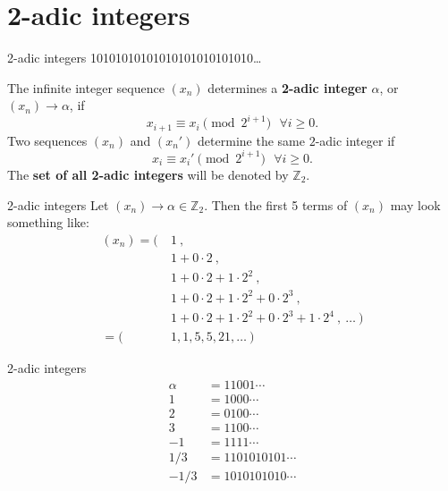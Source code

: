\documentclass{beamer}
\def\zzz{\mathbb{Z}}
\def\xn{(x_n)}
\begin{document}
\section{2-adic integers}
\begin{frame}{2-adic integers}
  10101010101010101010101010\ldots\\
  \pause
  \begin{definition}
    The infinite integer sequence $\xn$
    determines a {\bf 2-adic integer} $\alpha$, or
    $\xn \rightarrow \alpha$, if
    \begin{equation} \label{eq:seq}
    x_{i+1} \equiv x_i\pmod{2^{i+1}} \ \ \ \forall i \geq 0.
    \end{equation}
    Two sequences $\xn$ and $(x_n')$ determine the same $2$-adic integer if 
  \begin{equation} \label{eq:equiv}
    x_i \equiv x_i' \pmod{2^{i+1}}\ \ \ \forall i \geq 0.
  \end{equation}
    The {\bf set of all 2-adic integers} will be denoted by $\zzz_2$.
  \end{definition}
\end{frame}

\begin{frame}{2-adic integers}
  Let $\xn \rightarrow \alpha \in \zzz_2$. Then the first 5 terms of
  $\xn$ may look something like:
  \begin{align*}
    \xn = (&\ 1\ , \\
           &\ 1+0\cdot2 \ , \\
           &\ 1+0\cdot2+1\cdot2^2 \ ,\\
           &\ 1+0\cdot2+1\cdot2^2+0\cdot2^3 \ ,\\
           &\ 1+0\cdot2+1\cdot2^2+0\cdot2^3+1\cdot2^4 \ , \ \dots\ )\\
        = (&\ 1,1,5,5,21,\dots \ )
  \end{align*}
\end{frame}

\begin{frame}{2-adic integers}
  \begin{align*}
    \alpha&=11001\cdots\\
    1&=1000\cdots\\
    2&=0100\cdots\\
    3&=1100\cdots\\
    -1&=1111\cdots\\
    1/3&=1101010101\cdots\\
    -1/3&=1010101010\cdots
  \end{align*}
\end{frame}
\end{document}
